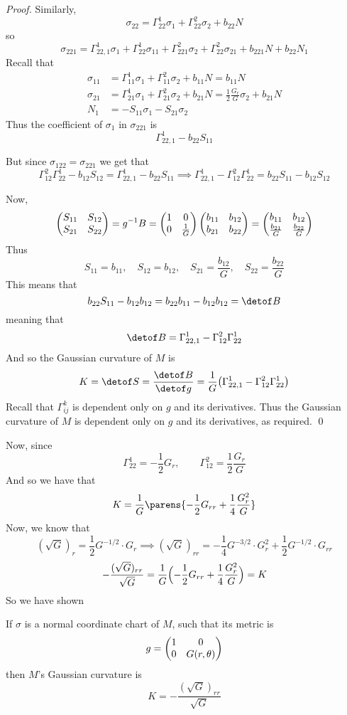 \begin{proof}
    Similarly,
    \[ \sigma_{22} = \Gamma_{22}^1\sigma_1 + \Gamma_{22}^2\sigma_2 + b_{22}N  \]
    so
    \[ \sigma_{221} = \Gamma_{22,1}^1\sigma_1 + \Gamma_{22}^1\sigma_{11} + \Gamma_{221}^2\sigma_2 + \Gamma_{22}^2\sigma_{21} + b_{221}N + b_{22}N_1 \]
    Recall that
    \begin{align*}
        \sigma_{11} &= \Gamma_{11}^1\sigma_1 + \Gamma_{11}^2\sigma_2 + b_{11}N = b_{11}N \\
        \sigma_{21} &= \Gamma_{21}^1\sigma_1 + \Gamma_{21}^2\sigma_2 + b_{21}N = \frac12\frac{G_r}G\sigma_2 + b_{21}N \\
        N_1 &= -S_{11}\sigma_1 - S_{21}\sigma_2
    \end{align*}
    Thus the coefficient of $\sigma_1$ in $\sigma_{221}$ is
    \[ \Gamma_{22,1}^1 - b_{22}S_{11} \]
    
    But since $\sigma_{122}=\sigma_{221}$ we get that
    \[ \Gamma_{12}^2\Gamma_{22}^1 - b_{12}S_{12} = \Gamma_{22,1}^1 - b_{22}S_{11} \implies \Gamma_{22,1}^1 - \Gamma_{12}^2\Gamma_{22}^1 = b_{22}S_{11} - b_{12}S_{12} \]
    
    Now,
    \[ \begin{pmatrix}S_{11} & S_{12} \\ S_{21} & S_{22}\end{pmatrix} = g^{-1}B = \begin{pmatrix}1 & 0 \\ 0 & \frac1G\end{pmatrix}\begin{pmatrix}b_{11} & b_{12} \\ b_{21} & b_{22}\end{pmatrix} = \begin{pmatrix}b_{11} & b_{12} \\ \frac{b_{21}}G & \frac{b_{22}}G\end{pmatrix} \]
    Thus
    \[ S_{11} = b_{11},\quad S_{12} = b_{12},\quad S_{21} = \frac{b_{12}}G,\quad S_{22} = \frac{b_{22}}G \]
    This means that
    \[ b_{22}S_{11} - b_{12}b_{12} = b_{22}b_{11} - b_{12}b_{12} = \detof B \]
    meaning that
    \[ \detof B = \Gamma_{22,1}^1 - \Gamma_{12}^2\Gamma_{22}^1 \]
    And so the Gaussian curvature of $M$ is
    \[ K = \detof S = \frac{\detof B}{\detof g} = \frac1G\bigl(\Gamma_{22,1}^1 - \Gamma_{12}^2\Gamma_{22}^1\bigr) \]
    Recall that $\Gamma_{ij}^k$ is dependent only on $g$ and its derivatives.
    Thus the Gaussian curvature of $M$ is dependent only on $g$ and its derivatives, as required.
    \qed

\end{proof}

Now, since
\[ \Gamma_{22}^1 = -\frac12G_r,\qquad \Gamma_{12}^2=\frac12\frac{G_r}G \]
And so we have that
\[ K = \frac1G\parens{-\frac12G_{rr} + \frac14\frac{G_r^2}G} \]
Now, we know that
\[ (\sqrt G)_r = \frac12 G^{-1/2}\cdot G_r \implies (\sqrt G)_{rr} = -\frac14 G^{-3/2}\cdot G_r^2 + \frac12 G^{-1/2}\cdot G_{rr} \]
\[ -\frac{(\sqrt G)_{rr}}{\sqrt G} = \frac1G\Bigl(-\frac12G_{rr} + \frac14\frac{G_r^2}G\Bigr) = K \]
So we have shown

\begin{coro*}

    If $\sigma$ is a normal coordinate chart of $M$, such that its metric is
    \[ g = \begin{pmatrix}1 & 0 \\ 0 & G(r,\theta)\end{pmatrix} \]
    then $M$'s Gaussian curvature is
    \[ K = -\frac{(\sqrt G)_{rr}}{\sqrt G} \]

\end{coro*}

